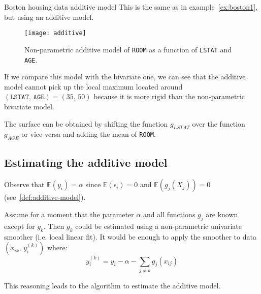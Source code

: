 \begin{example}{Boston housing data additive model}{}
    This is the same as in example~\ref{ex:boston1}, but using an additive model.
    \begin{figure}[H]
        \texttt{[image: additive]}
        \caption{Non-parametric additive model of \texttt{ROOM} as a function of \texttt{LSTAT} and \texttt{AGE}.}
    \end{figure}

    \tcblower

    If we compare this model with the bivariate one, we can see that the additive model
    cannot pick up the local maximum located around $(\texttt{LSTAT},\, \texttt{AGE}) = (35,\, 50)$ because
    it is more rigid than the non-parametric bivariate model.

    \begin{note}
        The surface can be obtained by shifting the function $g_{LSTAT}$ over the function
        $g_{AGE}$ or vice versa and adding the mean of \texttt{ROOM}.
    \end{note}
\end{example}

\pagebreak
\subsection{Estimating the additive model}
Observe that $\mathds{E}(y_i) = \alpha$ since $\mathds{E}(\epsilon_i) = 0$
and $\mathds{E}(g_j(X_{j})) = 0$ (see~\ref{def:additive-model}).

Assume for a moment that the parameter $\alpha$ and all functions
$g_j$ are known except for $g_k$. Then $g_k$ could be estimated using
a non-parametric univariate smoother (i.e. local linear fit).
It would be enough to apply the smoother to data $(x_{ik},\, y_i^{(k)})$
where:
\begin{equation*}
    y_i^{(k)} = y_i - \alpha - \sum_{j \neq k} g_j(x_{ij})
\end{equation*}

This reasoning leads to the  algorithm to estimate
the additive model.

